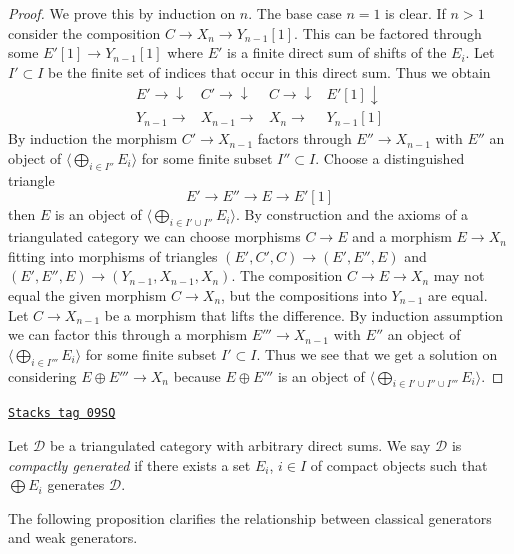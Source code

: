 \begin{proof}
We prove this by induction on $n$. The base case $n = 1$ is clear.
If $n > 1$ consider the composition $C \to X_n \to Y_{n - 1}[1]$.
This can be factored through some $E'[1] \to Y_{n - 1}[1]$ where
$E'$ is a finite direct sum of shifts of the $E_i$. Let $I' \subset I$
be the finite set of indices that occur in this direct sum. Thus we obtain
$$
\begin{array}{cccc}E' \longrightarrow\downarrow & C' \longrightarrow\downarrow & C \longrightarrow\downarrow & E'[1] \downarrow \\ Y_{n - 1} \longrightarrow & X_{n - 1} \longrightarrow & X_n \longrightarrow & Y_{n - 1}[1]\end{array}
$$
By induction the morphism $C' \to X_{n - 1}$ factors through
$E'' \to X_{n - 1}$ with $E''$ an object of
$\langle \bigoplus_{i \in I''} E_i \rangle$
for some finite subset $I'' \subset I$. Choose a distinguished
triangle
$$
E' \to E'' \to E \to E'[1]
$$
then $E$ is an object of $\langle \bigoplus_{i \in I' \cup I''} E_i \rangle$.
By construction and the axioms of a triangulated category we can choose
morphisms $C \to E$ and a morphism $E \to X_n$ fitting into morphisms
of triangles $(E', C', C) \to (E', E'', E)$ and
$(E', E'', E) \to (Y_{n - 1}, X_{n - 1}, X_n)$. The composition
$C \to E \to X_n$ may not equal the given morphism $C \to X_n$, but
the compositions into $Y_{n - 1}$ are equal. Let $C \to X_{n - 1}$
be a morphism that lifts the difference. By induction assumption we
can factor this through a morphism $E''' \to X_{n - 1}$ with
$E''$ an object of $\langle \bigoplus_{i \in I'''} E_i \rangle$
for some finite subset $I' \subset I$. Thus we see that we get
a solution on considering $E \oplus E''' \to X_n$ because
$E \oplus E'''$ is an object of
$\langle \bigoplus_{i \in I' \cup I'' \cup I'''} E_i \rangle$.
\end{proof}

\begin{definition}
\label{derived-definition-compactly-generated}
\href{https://stacks.math.columbia.edu/tag/09SQ}{\texttt{Stacks tag 09SQ}}

Let $\mathcal{D}$ be a triangulated category with arbitrary direct
sums. We say $\mathcal{D}$ is {\it compactly generated} if
there exists a set $E_i$, $i \in I$ of compact objects such that
$\bigoplus E_i$ generates $\mathcal{D}$.
\end{definition}

The following proposition clarifies the relationship between
classical generators and weak generators.

